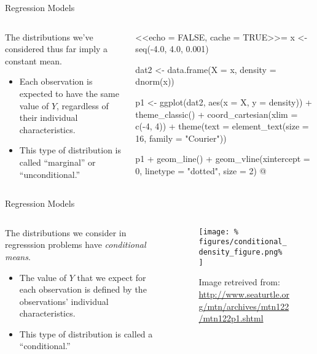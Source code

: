 \documentclass{beamer}
\begin{document}
\begin{frame}{Regression Models}

  \begin{columns}
    \begin{column}{0.5\textwidth}
      The distributions we've considered thus far imply a constant mean.
      \va
      \begin{itemize}
      \item Each observation is expected to have the same value of $Y$,
        regardless of their individual characteristics.
        \va
      \item This type of distribution is called ``marginal'' or ``unconditional.''
      \end{itemize}
    \end{column}
    
    \begin{column}{0.5\textwidth}
      
<<echo = FALSE, cache = TRUE>>=
x <- seq(-4.0, 4.0, 0.001)

dat2 <- data.frame(X = x, density = dnorm(x))

p1 <- ggplot(dat2, aes(x = X, y = density)) + theme_classic() +
    coord_cartesian(xlim = c(-4, 4)) +
    theme(text = element_text(size = 16, family = "Courier"))

p1 + geom_line() +
    geom_vline(xintercept = 0, linetype = "dotted", size = 2)
@

\end{column}
\end{columns}

\end{frame}


\begin{frame}{Regression Models}
  
  \begin{columns}
    \begin{column}{0.5\textwidth}
      The distributions we consider in regresssion problems have
      \emph{conditional means}.
      \va
      \begin{itemize}
      \item The value of $Y$ that we expect for each observation is defined by
        the observations' individual characteristics.
        \va
      \item This type of distribution is called a ``conditional.''
      \end{itemize}
    \end{column}
    
    \begin{column}{0.5\textwidth}
      
      \begin{figure}
        \texttt{[image: \%          
          figures/conditional\_density\_figure.png\%
        ]}
        \caption{\tiny{Image retreived from:
            \url{http://www.seaturtle.org/mtn/archives/mtn122/mtn122p1.shtml}}}
      \end{figure}
      
    \end{column}
  \end{columns}
  
\end{frame}
\end{document}
